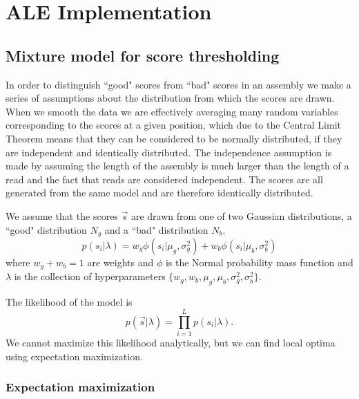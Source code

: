 \documentclass[phd,tocprelim]{cornell}
\begin{document}

\chapter{ALE Implementation} %
\label{cha:ALE Implementation}

\section{Mixture model for score thresholding}
\label{mixturemodel}

In order to distinguish ``good" scores from ``bad" scores in an assembly we make a series of assumptions about the distribution from which the scores are drawn. When we smooth the data we are effectively averaging many random variables corresponding to the scores at a given position, which due to the Central Limit Theorem means that they can be considered to be normally distributed, if they are independent and identically distributed. The independence assumption is made by assuming the length of the assembly is much larger than the length of a read and the fact that reads are considered independent. The scores are all generated from the same model and are therefore identically distributed.

We assume that the scores $\vec{s}$ are drawn from one of two Gaussian distributions, a ``good" distribution $N_{g}$ and a ``bad" distribution $N_{b}$.
\begin{equation}
    p\left(s_{i}|\lambda\right) = w_{g} \phi\left(s_{i} | \mu_{g}, \sigma^{2}_{g}\right) + w_{b} \phi\left(s_{i} | \mu_{b}, \sigma^{2}_{b}\right)
\end{equation}
where $w_{g} + w_{b} = 1$ are weights and $\phi$ is the Normal probability mass function and $\lambda$ is the collection of hyperparameters $\{w_{g}, w_{b}, \mu_{g}, \mu_{b}, \sigma^{2}_{g}, \sigma^{2}_{b}\}$.

The likelihood of the model is
\begin{equation}
    p\left(\vec{s}|\lambda\right) = \prod_{i=1}^{L} p\left(s_{i}|\lambda\right).
\end{equation}
We cannot maximize this likelihood analytically, but we can find local optima using expectation maximization.

\subsection{Expectation maximization}
\end{document}
